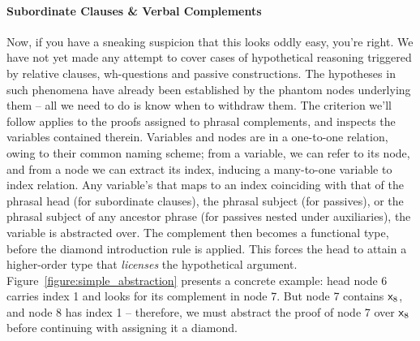 \paragraph{Subordinate Clauses \& Verbal Complements}
Now, if you have a sneaking suspicion that this looks oddly easy, you're right.
We have not yet made any attempt to cover cases of hypothetical reasoning triggered by relative clauses, wh-questions and passive constructions.
The hypotheses in such phenomena have already been established by the phantom nodes underlying them -- all we need to do is know when to withdraw them.
The criterion we'll follow applies to the proofs assigned to phrasal complements, and inspects the variables contained therein.
Variables and nodes are in a one-to-one relation, owing to their common naming scheme; from a variable, we can refer to its node, and from a node we can extract its index, inducing a many-to-one variable to index relation.
Any variable's that maps to an index coinciding with that of the phrasal head (for subordinate clauses), the phrasal subject (for passives), or the phrasal subject of any ancestor phrase (for passives nested under auxiliaries), the variable is abstracted over.
The complement then becomes a functional type, before the diamond introduction rule is applied.
This forces the head to attain a higher-order type that \textit{licenses} the hypothetical argument.
Figure~\ref{figure:simple_abstraction} presents a concrete example: head node 6 carries index 1 and looks for its complement in node 7.
But node 7 contains $\mathsf{x}_{\mathnormal{8}}$, and node 8 has index 1 -- therefore, we must abstract the proof of node 7 over $\mathsf{x}_{\mathnormal{8}}$ before continuing with assigning it a diamond.

